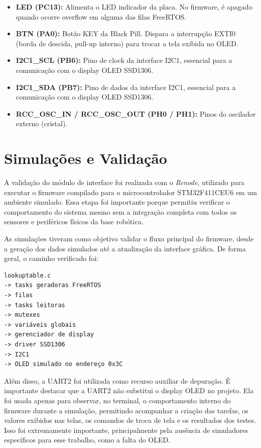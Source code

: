 \documentclass[a4paper,10pt]{article}
\begin{document}
\begin{itemize}
    \item \textbf{LED (PC13):} Alimenta o LED indicador da placa. No firmware, é apagado quando ocorre overflow em alguma das filas FreeRTOS.
    \item \textbf{BTN (PA0):} Botão KEY da Black Pill. Dispara a interrupção EXTI0 (borda de descida, pull-up interno) para trocar a tela exibida no OLED.
    \item \textbf{I2C1\_SCL (PB6):} Pino de clock da interface I2C1, essencial para a comunicação com o display OLED SSD1306.
    \item \textbf{I2C1\_SDA (PB7):} Pino de dados da interface I2C1, essencial para a comunicação com o display OLED SSD1306.
    \item \textbf{RCC\_OSC\_IN / RCC\_OSC\_OUT (PH0 / PH1):} Pinos do oscilador externo (cristal).
\end{itemize}

\section{Simulações e Validação}

A validação do módulo de interface foi realizada com o \textit{Renode}, utilizado para executar o firmware compilado para o microcontrolador STM32F411CEU6 em um ambiente simulado. Essa etapa foi importante porque permitiu verificar o comportamento do sistema mesmo sem a integração completa com todos os sensores e periféricos físicos da base robótica.

As simulações tiveram como objetivo validar o fluxo principal do firmware, desde a geração dos dados simulados até a atualização da interface gráfica. De forma geral, o caminho verificado foi:

\begin{verbatim}
lookuptable.c
-> tasks geradoras FreeRTOS
-> filas
-> tasks leitoras
-> mutexes
-> variáveis globais
-> gerenciador de display
-> driver SSD1306
-> I2C1
-> OLED simulado no endereço 0x3C
\end{verbatim}

Além disso, a UART2 foi utilizada como recurso auxiliar de depuração. É importante destacar que a UART2 não substitui o display OLED no projeto. Ela foi usada apenas para observar, no terminal, o comportamento interno do firmware durante a simulação, permitindo acompanhar a criação das tarefas, os valores exibidos nas telas, os comandos de troca de tela e os resultados dos testes. Isso foi extremamente importante, principalmente pela ausência de simuladores específicos para esse trabalho, como a falta do OLED.
\end{document}
